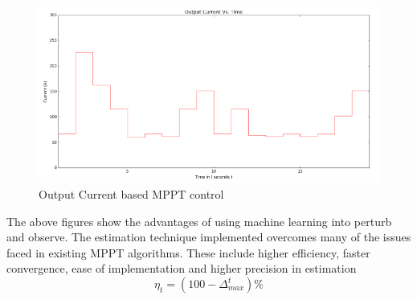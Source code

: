 \begin{center}
\begin{figure}
\includegraphics[width=12cm,keepaspectratio]{9.png}
\caption {Output Current based MPPT control}
\label{Figure:10}    
\end{figure}
\end{center}
The above figures show the advantages of using machine learning into perturb and observe. The estimation technique implemented overcomes many of the issues faced in existing MPPT algorithms. These include higher efficiency, faster convergence, ease of implementation and higher precision in estimation
\begin{equation} \label{eq:10}
\eta_t  = (100 - \Delta_{max}^t)\%
\end{equation}

